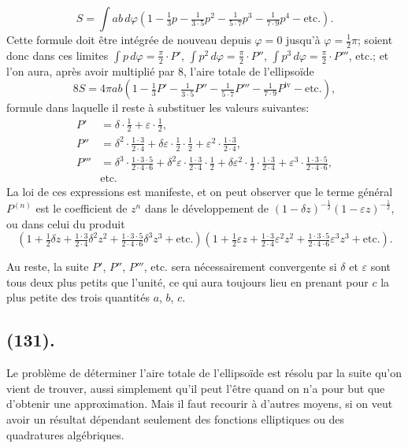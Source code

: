 \documentclass{article}
\begin{document}
\[ S=\int ab\,d\varphi\left(1-\tfrac{1}{3}p-\tfrac{1}{3\cdot5}p^{2}-\tfrac{1}{5\cdot7}p^{3}-\tfrac{1}{7\cdot9}p^{4}-\text{etc.}\right). \]
Cette formule doit être intégrée de nouveau depuis $\varphi=0$ jusqu'à $\varphi=\frac{1}{2}\pi$; soient donc dans ces limites $\displaystyle\int p\,d\varphi=\frac{\pi}{2}\cdot P'$, $\displaystyle\int p^{2}\,d\varphi=\frac{\pi}{2}\cdot P''$, $\displaystyle\int p^{3}\,d\varphi=\frac{\pi}{2}\cdot P'''$, etc.; et l'on aura, après avoir multiplié par 8, l'aire totale de l'ellipsoïde
\[ 8S=4\pi ab\left(1-\tfrac{1}{3}P'-\tfrac{1}{3\cdot5}P''-\tfrac{1}{5\cdot7}P'''-\tfrac{1}{7\cdot9}P^{\text{iv}}-\text{etc.}\right), \]
formule dans laquelle il reste à substituer les valeurs suivantes:
\[ \begin{aligned} P'&=\delta\cdot\tfrac{1}{2}+\varepsilon\cdot\tfrac{1}{2},\\ P''&=\delta^{2}\cdot\tfrac{1\cdot3}{2\cdot4}+\delta\varepsilon\cdot\tfrac{1}{2}\cdot\tfrac{1}{2}+\varepsilon^{2}\cdot\tfrac{1\cdot3}{2\cdot4},\\ P'''&=\delta^{3}\cdot\tfrac{1\cdot3\cdot5}{2\cdot4\cdot6}+\delta^{2}\varepsilon\cdot\tfrac{1\cdot3}{2\cdot4}\cdot\tfrac{1}{2}+\delta\varepsilon^{2}\cdot\tfrac{1}{2}\cdot\tfrac{1\cdot3}{2\cdot4}+\varepsilon^{3}\cdot\tfrac{1\cdot3\cdot5}{2\cdot4\cdot6},\\ &\text{etc.} \end{aligned} \]
La loi de ces expressions est manifeste, et on peut observer que le terme général $P^{(n)}$ est le coefficient de $z^{n}$ dans le développement de $(1-\delta z)^{-\frac{1}{2}}(1-\varepsilon z)^{-\frac{1}{2}}$, ou dans celui du produit
\[ \left(1+\tfrac{1}{2}\delta z+\tfrac{1\cdot3}{2\cdot4}\delta^{2}z^{2}+\tfrac{1\cdot3\cdot5}{2\cdot4\cdot6}\delta^{3}z^{3}+\text{etc.}\right)\left(1+\tfrac{1}{2}\varepsilon z+\tfrac{1\cdot3}{2\cdot4}\varepsilon^{2}z^{2}+\tfrac{1\cdot3\cdot5}{2\cdot4\cdot6}\varepsilon^{3}z^{3}+\text{etc.}\right). \]

Au reste, la suite $P'$, $P''$, $P'''$, etc. sera nécessairement convergente si $\delta$ et $\varepsilon$ sont tous deux plus petits que l'unité, ce qui aura toujours lieu en prenant pour $c$ la plus petite des trois quantités $a$, $b$, $c$.

\subsection*{(131).}

Le problème de déterminer l'aire totale de l'ellipsoïde est résolu par la suite qu'on vient de trouver, aussi simplement qu'il peut l'être quand on n'a pour but que d'obtenir une approximation. Mais il faut recourir à d'autres moyens, si on veut avoir un résultat dépendant seulement des fonctions elliptiques ou des quadratures algébriques.
\end{document}
